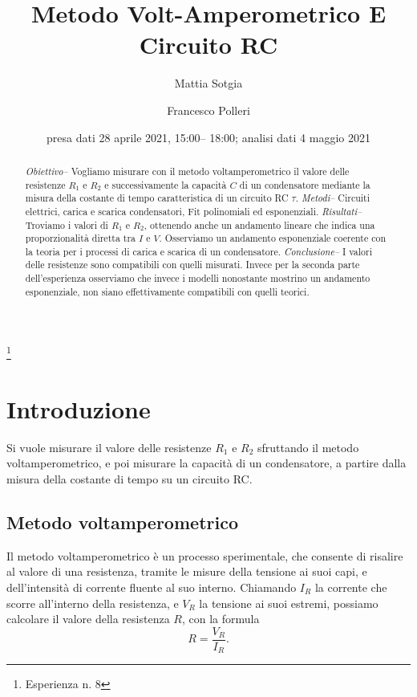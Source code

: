 \documentclass[
    reprint, 
    superscriptaddress, 
    altaffilletter, 
    amsmath, 
    amssymb, 
    a4paper
]{revtex4-2}
\begin{document}
\title{Metodo Volt-Amperometrico E Circuito RC}
\thanks{Esperienza n. 8}

\author{Mattia Sotgia}
\author{Francesco Polleri}

\date{presa dati
28 aprile 2021, 15:00– 18:00; analisi dati 
4 maggio 2021}

\begin{abstract}
    \textit{Obiettivo-- }
    Vogliamo misurare con il metodo voltamperometrico il valore delle resistenze $R_1$ e $R_2$ e successivamente la capacità $C$ di un condensatore mediante la misura della costante di tempo caratteristica di un circuito RC $\tau$.
    \textit{Metodi-- }
    Circuiti elettrici, carica e scarica condensatori, Fit polinomiali ed esponenziali. 
    \textit{Risultati-- }
    Troviamo i valori di $R_1$ e $R_2$, ottenendo anche un andamento lineare che indica una proporzionalità diretta tra $I$ e $V$. Osserviamo un andamento esponenziale coerente con la teoria per i processi di carica e scarica di un condensatore.
    \textit{Conclusione-- }
    I valori delle resistenze sono compatibili con quelli misurati. Invece per la seconda parte dell'esperienza osserviamo che invece i modelli nonostante mostrino un andamento esponenziale, non siano effettivamente compatibili con quelli teorici.
\end{abstract}
\maketitle
\thispagestyle{fancy}

\section{Introduzione}
    \label{section:introduction}

    Si vuole misurare il valore delle resistenze $R_1$ e $R_2$ sfruttando il metodo voltamperometrico, e poi misurare la capacità di un condensatore, a partire dalla misura della costante di tempo su un circuito RC. 

    \subsection{Metodo voltamperometrico}

    Il metodo voltamperometrico è un processo sperimentale, che consente di risalire al valore di una resistenza, tramite le misure della tensione ai suoi capi, e dell’intensità di corrente fluente al suo interno. Chiamando $I_R$ la corrente che scorre all’interno della resistenza, e $V_R$ la tensione ai suoi estremi, possiamo calcolare il valore della resistenza $R$, con la formula \[R=\frac{V_R}{I_R}.\]
\end{document}
